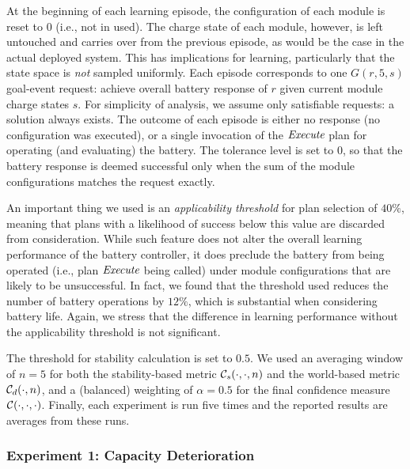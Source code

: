 At the beginning of each learning episode, the configuration of each module is reset to $0$ (i.e., not in used). 
The charge state of each module, however, is left untouched and carries over from the previous episode, as would be the case in the actual deployed system. This has implications for learning, particularly that the state space is \emph{not} sampled uniformly. %
Each episode corresponds to one $G(r,5,s)$ goal-event request: achieve overall battery response of $r$ given current module charge states $s$.  For simplicity of analysis, we assume only satisfiable requests: a solution always exists. The outcome of each episode is either no response (no configuration was executed), or a single invocation of the $\operatorname{\textit{Execute}}$ plan for operating (and evaluating) the battery.  The tolerance level is set to $0$, so that the battery response is deemed successful only when the sum of the module configurations matches the request exactly.

An important thing we used is an \emph{applicability threshold} for plan selection of $40\%$, meaning that plans with a likelihood of success below this value are discarded from consideration. While such feature does not alter the overall learning performance of the battery controller, it does preclude the battery from being operated (i.e., plan $\operatorname{\textit{Execute}}$ being called) under module configurations that are likely to be unsuccessful. In fact, we found that the threshold used reduces the number of battery operations by $12\%$, which is substantial when considering battery life. Again, we stress that the difference in learning performance without the applicability threshold is not significant.


The threshold for stability calculation is set to $0.5$. We used an averaging window of $n=5$ for both the stability-based metric ${\mathcal{C}}_s(\cdot,\cdot,n)$ and the world-based metric ${\mathcal{C}}_d(\cdot,n)$, and a (balanced) weighting of $\alpha=0.5$ for the final confidence measure ${\mathcal{C}}(\cdot,\cdot,\cdot)$.
Finally, each experiment is run five times and the reported results are averages from these runs.



\subsubsection{Experiment 1: Capacity Deterioration}


